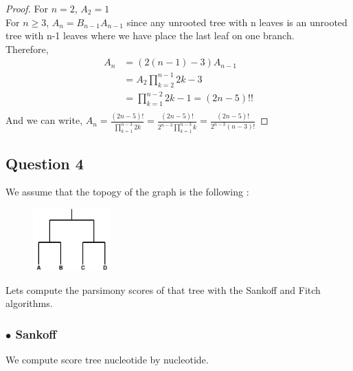 \documentclass[]{article}
\theoremstyle{definition}
\begin{document}
\begin{proof}For $n=2$, $A_{2} = 1$\\
For $n\geq 3$, $A_{n} = B_{n-1}A_{n-1}$ since any unrooted tree with n leaves is an unrooted tree with n-1 leaves where we have place the last leaf on one branch.\\
Therefore, 
\begin{align*}
A_{n} &= (2(n-1)-3)A_{n-1}\\
&= A_{2}{\displaystyle{\prod_{k=2}^{n-1} 2k - 3}}\\
&= {\displaystyle \prod_{k=1}^{n-2} 2k - 1} = (2n-5)!!\\
\end{align*}
And we can write,
$
A_{n} = \frac{(2n - 5)!}{\displaystyle \prod_{k=1}^{n-3} 2k}
=  \frac{(2n - 5)!}{2^{n-3}\displaystyle \prod_{k=1}^{n-3}k}
= \frac{(2n - 5)!}{2^{n-3}(n-3)!}
$
\end{proof}
\newpage
\subsection{Question 4}
We assume that the topogy of the graph is the following :

\begin{figure}[h!]
	\centering
	\includegraphics*[width = 3cm]{image/topology.png}
\end{figure}

Lets compute the parsimony scores of that tree with the Sankoff and Fitch algorithms.

\subsubsection*{$\bullet$ Sankoff }
We compute score tree nucleotide by nucleotide.
\end{document}
